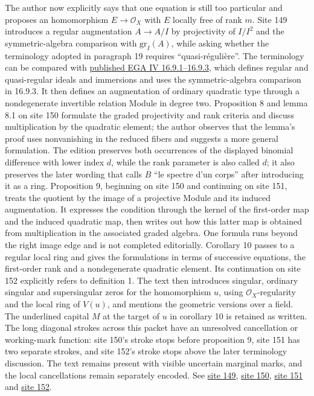 The author now explicitly says that one equation is still too particular and proposes an homomorphism $E\longrightarrow\mathcal O_X$ with $E$ locally free of rank $m$. Site 149 introduces a regular augmentation $A\longrightarrow A/I$ by projectivity of $I/I^2$ and the symmetric-algebra comparison with $\mathrm{gr}_I(A)$, while asking whether the terminology adopted in paragraph 19 requires ``quasi-régulière''. The terminology can be compared with \href{https://www.numdam.org/articles/10.1007/BF02732123/}{published EGA IV 16.9.1--16.9.3}, which defines regular and quasi-regular ideals and immersions and uses the symmetric-algebra comparison in 16.9.3. It then defines an augmentation of ordinary quadratic type through a nondegenerate invertible relation Module in degree two. Proposition 8 and lemma 8.1 on site 150 formulate the graded projectivity and rank criteria and discuss multiplication by the quadratic element; the author observes that the lemma's proof uses nonvanishing in the reduced fibers and suggests a more general formulation. The edition preserves both occurrences of the displayed binomial difference with lower index $d$, while the rank parameter is also called $d$; it also preserves the later wording that calls $B$ ``le spectre d'un corps'' after introducing it as a ring. Proposition 9, beginning on site 150 and continuing on site 151, treats the quotient by the image of a projective Module and its induced augmentation. It expresses the condition through the kernel of the first-order map and the induced quadratic map, then writes out how this latter map is obtained from multiplication in the associated graded algebra. One formula runs beyond the right image edge and is not completed editorially. Corollary 10 passes to a regular local ring and gives the formulations in terms of successive equations, the first-order rank and a nondegenerate quadratic element. Its continuation on site 152 explicitly refers to definition 1. The text then introduces singular, ordinary singular and supersingular zeros for the homomorphism $u$, using $\mathcal O_X$-regularity and the local ring of $V(u)$, and mentions the geometric versions over a field. The underlined capital $M$ at the target of $u$ in corollary 10 is retained as written. The long diagonal strokes across this packet have an unresolved cancellation or working-mark function: site 150's stroke stops before proposition 9, site 151 has two separate strokes, and site 152's stroke stops above the later terminology discussion. The text remains present with visible uncertain marginal marks, and the local cancellations remain separately encoded. See \href{https://grothendieck.umontpellier.fr/web/viewer.html?file=../25.pdf#page=150}{site 149}, \href{https://grothendieck.umontpellier.fr/web/viewer.html?file=../25.pdf#page=151}{site 150}, \href{https://grothendieck.umontpellier.fr/web/viewer.html?file=../25.pdf#page=152}{site 151} and \href{https://grothendieck.umontpellier.fr/web/viewer.html?file=../25.pdf#page=153}{site 152}.

